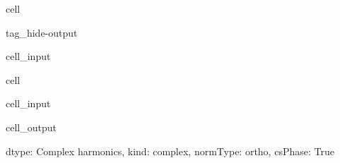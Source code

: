 \documentclass[letterpaper,table,10pt,english]{jupyterBook}
\begin{document}
\begin{sphinxuseclass}{cell}
\begin{sphinxuseclass}{tag_hide-output}\begin{sphinxVerbatimInput}

\begin{sphinxuseclass}{cell_input}
\begin{sphinxVerbatim}[commandchars=\\\{\}]

\end{sphinxVerbatim}

\end{sphinxuseclass}\end{sphinxVerbatimInput}

\end{sphinxuseclass}
\end{sphinxuseclass}
\begin{sphinxuseclass}{cell}\begin{sphinxVerbatimInput}

\begin{sphinxuseclass}{cell_input}
\begin{sphinxVerbatim}[commandchars=\\\{\}]
\PYG{p}{[}\PYG{p}{]}
\end{sphinxVerbatim}

\end{sphinxuseclass}\end{sphinxVerbatimInput}
\begin{sphinxVerbatimOutput}

\begin{sphinxuseclass}{cell_output}
\begin{sphinxVerbatim}[commandchars=\\\{\}]
\PYGZob{}\PYGZsq{}dtype\PYGZsq{}: \PYGZsq{}Complex harmonics\PYGZsq{},
 \PYGZsq{}kind\PYGZsq{}: \PYGZsq{}complex\PYGZsq{},
 \PYGZsq{}normType\PYGZsq{}: \PYGZsq{}ortho\PYGZsq{},
 \PYGZsq{}csPhase\PYGZsq{}: True\PYGZcb{}
\end{sphinxVerbatim}

\end{sphinxuseclass}\end{sphinxVerbatimOutput}

\end{sphinxuseclass}
\end{document}
